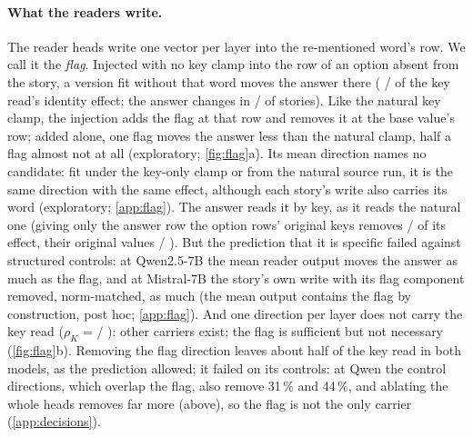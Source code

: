 \paragraph{What the readers write.}
The reader heads write one vector per layer into the re-mentioned word's row. We call it the \emph{flag}. Injected with no key clamp into the row of an option absent from the story, a version fit without that word moves the answer there (\JdOneRatioQwenSeven{} / \JdOneRatioMistralSeven{} of the key read's identity effect; the answer changes in \pct{\JdOnePiXQwenSeven} / \pct{\JdOnePiXMistralSeven} of stories)\rsk. Like the natural key clamp, the injection adds the flag at that row and removes it at the base value's row; added alone, one flag moves the answer less than the natural clamp, half a flag almost not at all (exploratory; \cref{fig:flag}a). Its mean direction names no candidate: fit under the key-only clamp or from the natural source run, it is the same direction with the same effect, although each story's write also carries its word (exploratory; \cref{app:flag}). The answer reads it by key, as it reads the natural one (giving only the answer row the option rows' original keys removes \JdFourKQwenSeven{} / \JdFourKMistralSeven{} of its effect, their original values \JdFourVQwenSeven{} / \JdFourVMistralSeven{}). But the prediction\rsk{} that it is specific failed against structured controls: at Qwen2.5-7B the mean reader output moves the answer \JdTwoRatioMeanHQwenSeven{} as much as the flag, and at Mistral-7B the story's own write with its flag component removed, norm-matched, \JdTwoRatioOrthMistralSeven{} as much (the mean output contains the flag by construction, post hoc; \cref{app:flag}). And one direction per layer does not carry the key read ($\rho_K$ = \JdThreeRhoFlagQwenSeven{} / \JdThreeRhoFlagMistralSeven{}): other carriers exist; the flag is sufficient but not necessary (\cref{fig:flag}b). Removing the flag direction leaves about half of the key read in both models, as the prediction\rsk{} allowed; it failed on its controls: at Qwen the control directions, which overlap the flag, also remove 31\,\% and 44\,\%, and ablating the whole heads removes far more (above), so the flag is not the only carrier (\cref{app:decisions}). %

